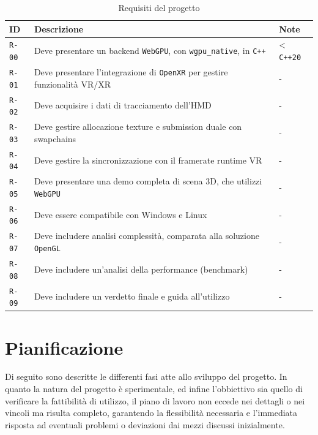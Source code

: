 \documentclass[a4paper, 11pt, twoside]{report}
\begin{document}
\begin{table}[h]
\centering
\caption{Requisiti del progetto}\label{tab:req}
\begin{tabular}{@{}lp{12cm}l@{}}
\toprule
\textbf{ID}   & \textbf{Descrizione}                                                                    & \textbf{Note}    \\ \midrule
\texttt{R-00} & Deve presentare un backend \texttt{WebGPU}, con \texttt{wgpu\_native}, in \texttt{C++}  & < \texttt{C++20} \\
\texttt{R-01} & Deve presentare l'integrazione di \texttt{\gls{OpenXR}} per gestire funzionalità VR/XR  & -                \\
\texttt{R-02} & Deve acquisire i dati di tracciamento dell'\gls{HMD}                                    & -                \\
\texttt{R-03} & Deve gestire allocazione texture e submission duale con swapchains                      & -                \\
\texttt{R-04} & Deve gestire la sincronizzazione con il \gls{framerate} runtime VR                      & -                \\
\texttt{R-05} & Deve presentare una demo completa di scena 3D, che utilizzi \texttt{WebGPU}             & -                \\
\texttt{R-06} & Deve essere compatibile con Windows e Linux                                             & -                \\
\texttt{R-07} & Deve includere analisi complessità, comparata alla soluzione \texttt{OpenGL}            & -                \\
\texttt{R-08} & Deve includere un'analisi della performance (benchmark)                                 & -                \\
\texttt{R-09} & Deve includere un verdetto finale e guida all'utilizzo                                  & -                \\
\bottomrule
\end{tabular}
\end{table}

\section{Pianificazione}

Di seguito sono descritte le differenti fasi atte allo sviluppo del progetto. In quanto la natura del progetto è
sperimentale, ed infine l'obbiettivo sia quello di verificare la fattibilità di utilizzo, il piano di lavoro non eccede
nei dettagli o nei vincoli ma risulta completo, garantendo la flessibilità necessaria e l'immediata risposta ad
eventuali problemi o deviazioni dai mezzi discussi inizialmente.
\end{document}
